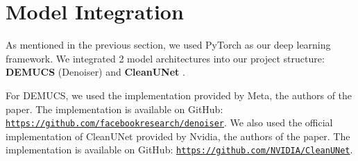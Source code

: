 \section{Model Integration}

As mentioned in the previous section, we used PyTorch as our deep learning framework. We integrated 2 model architectures into our project structure: \textbf{DEMUCS} (Denoiser) \cite{defossez2020} and \textbf{CleanUNet} \cite{kong2022}.

For DEMUCS, we used the implementation provided by Meta, the authors of the paper. The implementation is available on GitHub: \texttt{\url{https://github.com/facebookresearch/denoiser}}. We also used the official implementation of CleanUNet provided by Nvidia, the authors of the paper. The implementation is available on GitHub: \texttt{\url{https://github.com/NVIDIA/CleanUNet}}.